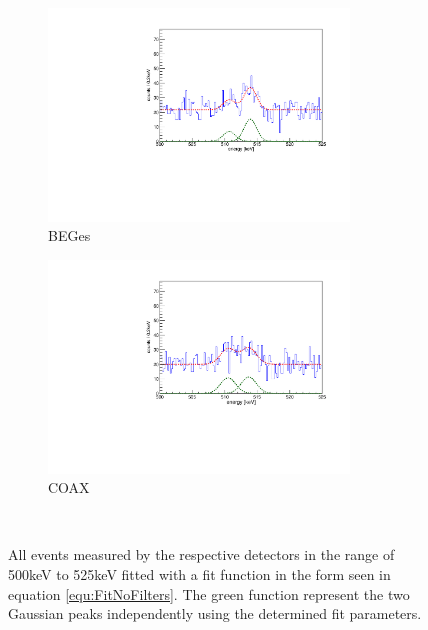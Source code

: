 \begin{figure}[t!]
	\centering
	\begin{subfigure}{.5\textwidth}
		\centering
		\includegraphics[width=80mm]{./Bilder/500525FitNoFilterBEGes.pdf}
		\caption{BEGes}
		\label{fig:FitNoFilterBEGes}
	\end{subfigure}%
	\begin{subfigure}{.5\textwidth}
		\centering
		\includegraphics[width=80mm]{./Bilder/500525FitNoFilterCOAX.pdf}
		\caption{COAX}
		\label{fig:FitNoFilterCOAX}
	\end{subfigure}
    \\
	\vspace{0.5cm}
	\caption{All events measured by the respective detectors in the range of 500keV to 525keV fitted with a fit function in the form seen in equation \ref{equ:FitNoFilters}. The green function represent the two Gaussian peaks independently using the determined fit parameters.}
\vspace{0.5cm}
\end{figure}
\\


